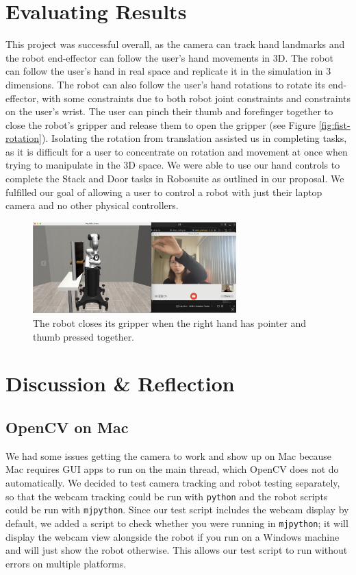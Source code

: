 \documentclass{article}
\begin{document}
\section{Evaluating Results}
\label{sec:result}
This project was successful overall, as the camera can track hand landmarks and
the robot end-effector can follow the user's hand movements in 3D. The robot
can follow the user's hand in real space and replicate it in the simulation in
3 dimensions. The robot can also follow the user's hand rotations to rotate its
end-effector, with some constraints due to both robot joint constraints and
constraints on the user's wrist. The user can pinch their thumb and forefinger
together to close the robot's gripper and release them to open the gripper (see
Figure \ref{fig:fist-rotation}). Isolating the rotation from translation
assisted us in completing tasks, as it is difficult for a user to concentrate
on rotation and movement at once when trying to manipulate in the 3D space. We
were able to use our hand controls to complete the Stack and Door tasks in
Robosuite as outlined in our proposal. We fulfilled our goal of allowing a user
to control a robot with just their laptop camera and no other physical
controllers.
\begin{figure}[H]
  \centering
  \includegraphics[width=0.7\textwidth]{../assets/gripper.png}
  \caption{The robot closes its gripper when the right hand has pointer and thumb pressed together.  }
  \label{fig:gripper}
\end{figure}

\section{Discussion \& Reflection}
\label{sec:conclusion}
\subsection{OpenCV on Mac}
We had some issues getting the camera to work and show up on Mac because Mac
requires GUI apps to run on the main thread, which OpenCV does not do
automatically. We decided to test camera tracking and robot testing separately,
so that the webcam tracking could be run with \texttt{python} and the robot
scripts could be run with \texttt{mjpython}. Since our test script includes the
webcam display by default, we added a script to check whether you were running
in \texttt{mjpython}; it will display the webcam view alongside the robot if
you run on a Windows machine and will just show the robot otherwise. This
allows our test script to run without errors on multiple platforms.
\end{document}
